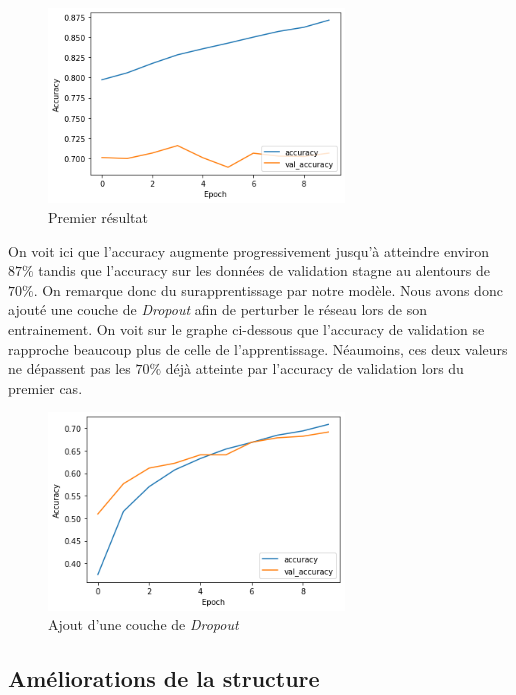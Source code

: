 \documentclass[12pt,titlepage]{article}
\begin{document}
\begin{figure}[!h]
  \centering
  \includegraphics[width=0.7\textwidth]{img/model_surapprentissage_acc.png}
  \caption{Premier résultat}
\end{figure}

On voit ici que l'accuracy augmente progressivement jusqu'à atteindre environ $87\%$ tandis que l'accuracy sur les données de validation stagne au alentours de $70\%$. On remarque donc du surapprentissage par notre modèle. Nous avons donc ajouté une couche de \textit{Dropout} afin de perturber le réseau lors de son entrainement. On voit sur le graphe ci-dessous que l'accuracy de validation se rapproche beaucoup plus de celle de l'apprentissage. Néaumoins, ces deux valeurs ne dépassent pas les $70\%$ déjà atteinte par l'accuracy de validation lors du premier cas.

\begin{figure}[!h]
  \centering
  \includegraphics[width=0.7\textwidth]{img/model_dropout_acc.png}
  \caption{Ajout d'une couche de \textit{Dropout}}
\end{figure}

\subsection{Améliorations de la structure}
\end{document}
